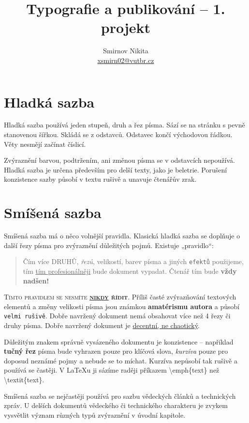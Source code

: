 \documentclass[10pt,twocolumn,a4paper]{article}
\title{Typografie a publikování -- 1. projekt}
\author{Smirnov Nikita \\ \href{mailto:xsmirn02@vutbr.cz}{xsmirn02@vutbr.cz}}
\date{}
\begin{document}
\maketitle

\section{Hladká sazba}
Hladká sazba používá jeden stupeň, druh a řez písma.
Sází se na stránku s pevně stanovenou šířkou.
Skládá se z odstavců. Odstavec končí východovou řádkou.
Věty nesmějí začínat číslicí.

Zvýraznění barvou, podtržením, ani změnou písma se v odstavcích nepoužívá.
Hladká sazba je určena především pro delší texty, jako je beletrie.
Porušení konzistence sazby působí v textu rušivě a unavuje čtenářův zrak.

\section{Smíšená sazba}
Smíšená sazba má o něco volnější pravidla.
Klasická hladká sazba se doplňuje o další řezy písma pro zvýraznění důležitých pojmů.
Existuje „pravidlo“:

\begin{quote}
    \hspace{0.5cm}Čím více \MakeUppercase{druhů}, \textit{řezů}, {\scriptsize{velikostí}}, {\color{green}barev} písma a jiných \texttt{efektů} použijeme, tím \underline{tím profesionálněji} bude {\selectfont dokument} vypadat. 
    Čtenář tím bude \textbf{\LARGE{vždy nadšen!}}
\end{quote}

\textsc{Tímto pravidlem se nesmíte \textbf{\underline{nikdy} řídit}}.
Příliš časté zvýrazňování textových elementů a změny {\scriptsize{velikosti}} písma jsou známkou \textbf{amatérismu autora} a působí \texttt{velmi rušivě}.
Dobře navržený dokument nemá obsahovat více než 4 řezy či druhy písma.
Dobře navržený dokument je \underline{decentní, ne chaotický}.

Důležitým znakem správně vysázeného dokumentu je konzistence -- například \textbf{tučný řez} písma bude vyhrazen pouze pro klíčová slova, \textit{kurzíva} pouze pro doposud neznámé pojmy a nebude se to míchat.
Kurzíva nepůsobí tak rušivě a používá se častěji.
V \LaTeX u ji sázíme raději příkazem \textbackslash emph\{text\} než \textbackslash textit\{text\}.

Smíšená sazba se nejčastěji používá pro sazbu vědeckých článků a technických zpráv.
U delších dokumentů vědeckého či technického charakteru je zvykem vysvětlit význam různých typů zvýraznění v úvodní kapitole.
\end{document}
